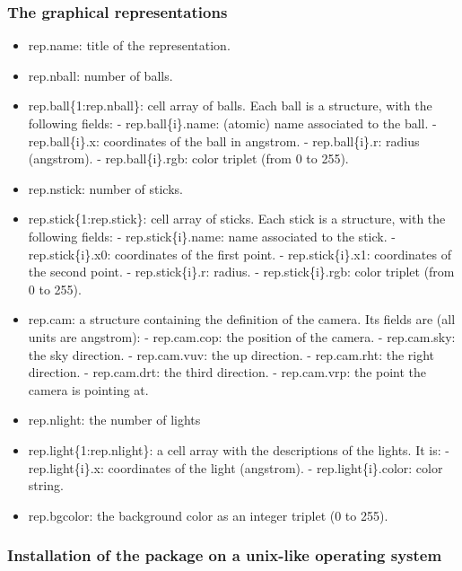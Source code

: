 \documentclass[a4paper]{article}
\begin{document}
\subsubsection{The graphical representations%
  \label{the-graphical-representations}%
}
%
\begin{itemize}

\item rep.name: title of the representation.

\item rep.nball: number of balls.

\item rep.ball\{1:rep.nball\}: cell array of balls. Each ball is a
structure, with the following fields:
- rep.ball\{i\}.name: (atomic) name associated to the ball.
- rep.ball\{i\}.x: coordinates of the ball in angstrom.
- rep.ball\{i\}.r: radius (angstrom).
- rep.ball\{i\}.rgb: color triplet (from 0 to 255).

\item rep.nstick: number of sticks.

\item rep.stick\{1:rep.stick\}: cell array of sticks. Each stick is a
structure, with the following fields:
- rep.stick\{i\}.name: name associated to the stick.
- rep.stick\{i\}.x0: coordinates of the first point.
- rep.stick\{i\}.x1: coordinates of the second point.
- rep.stick\{i\}.r: radius.
- rep.stick\{i\}.rgb: color triplet (from 0 to 255).

\item rep.cam: a structure containing the definition of the camera. Its
fields are (all units are angstrom):
- rep.cam.cop: the position of the camera.
- rep.cam.sky: the sky direction.
- rep.cam.vuv: the up direction.
- rep.cam.rht: the right direction.
- rep.cam.drt: the third direction.
- rep.cam.vrp: the point the camera is pointing at.

\item rep.nlight: the number of lights

\item rep.light\{1:rep.nlight\}: a cell array with the descriptions of the
lights. It is:
- rep.light\{i\}.x: coordinates of the light (angstrom).
- rep.light\{i\}.color: color string.

\item rep.bgcolor: the background color as an integer triplet (0 to 255).

\end{itemize}


\subsubsection{Installation of the package on a unix-like operating system%
  \label{installation-of-the-package-on-a-unix-like-operating-system}%
}
\end{document}
